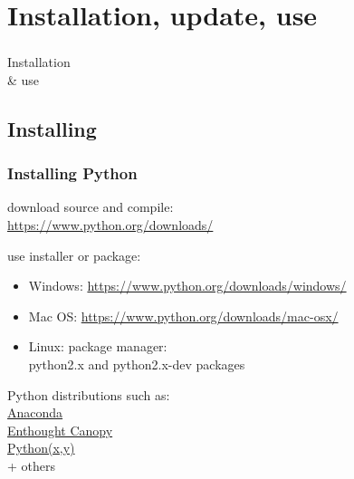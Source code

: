 \section{Installation, update, use}

{
\begin{frame}
\frametitle{}
{\fontsize{50}{60}\selectfont Installation\\
 \& use} 

\end{frame}
}


\subsection{Installing}

\begin{frame}
\frametitle{Installing Python}

\begin{description}

\item<1->[Hard way:] download source and compile:\\
\url{https://www.python.org/downloads/}

\item<2->[Normal way:] use installer or package:

\begin{itemize}
\item Windows: \url{https://www.python.org/downloads/windows/}
\item Mac OS: \url{https://www.python.org/downloads/mac-osx/}
\item Linux: package manager:\\
python2.x and python2.x-dev packages
\end{itemize}

\item<3->[Easy way:] Python distributions such as:\\
\href{https://www.continuum.io/downloads}{Anaconda} \\
\href{https://www.enthought.com/products/canopy/}{Enthought Canopy} \\
\href{http://python-xy.github.io/}{Python(x,y)} \\
+ others

\end{description}

\end{frame}

